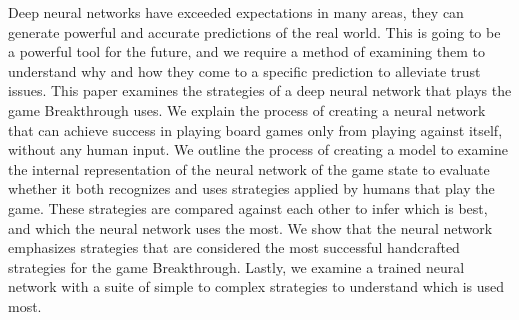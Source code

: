 Deep neural networks have exceeded expectations in many areas, they can generate powerful and accurate predictions of the real world. This is going to be a powerful tool for the future, and we require a method of examining them to understand why and how they come to a specific prediction to alleviate trust issues. This paper examines the strategies of a deep neural network that plays the game Breakthrough uses. We explain the process of creating a neural network that can achieve success in playing board games only from playing against itself, without any human input. We outline the process of creating a model to examine the internal representation of the neural network of the game state to evaluate whether it both recognizes and uses strategies applied by humans that play the game. These strategies are compared against each other to infer which is best, and which the neural network uses the most. We show that the neural network emphasizes strategies that are considered the most successful handcrafted strategies for the game Breakthrough. Lastly, we examine a trained neural network with a suite of simple to complex strategies to understand which is used most.